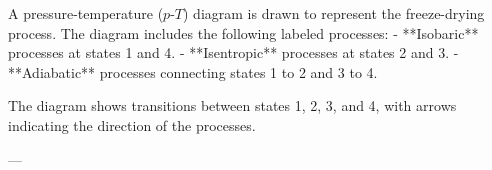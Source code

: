 A pressure-temperature (\( p \)-\( T \)) diagram is drawn to represent the freeze-drying process. The diagram includes the following labeled processes:  
- **Isobaric** processes at states 1 and 4.  
- **Isentropic** processes at states 2 and 3.  
- **Adiabatic** processes connecting states 1 to 2 and 3 to 4.  

The diagram shows transitions between states 1, 2, 3, and 4, with arrows indicating the direction of the processes.

---